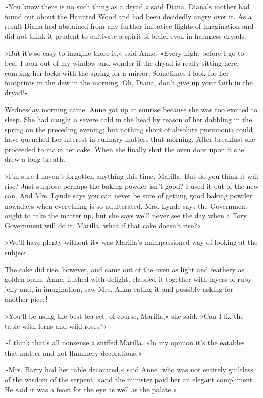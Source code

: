 »You know there is no such thing as a dryad,« said Diana. Diana's mother had found out about the Haunted Wood and had been decidedly angry over it. As a result Diana had abstained from any further imitative flights of imagination and did not think it prudent to cultivate a spirit of belief even in harmless dryads.

»But it's so easy to imagine there is,« said Anne. »Every night before I go to bed, I look out of my window and wonder if the dryad is really sitting here, combing her locks with the spring for a mirror. Sometimes I look for her footprints in the dew in the morning. Oh, Diana, don't give up your faith in the dryad!«

Wednesday morning came. Anne got up at sunrise because she was too excited to sleep. She had caught a severe cold in the head by reason of her dabbling in the spring on the preceding evening; but nothing short of absolute pneumonia could have quenched her interest in culinary matters that morning. After breakfast she proceeded to make her cake. When she finally shut the oven door upon it she drew a long breath.

»I'm sure I haven't forgotten anything this time, Marilla. But do you think it will rise? Just suppose perhaps the baking powder isn't good? I used it out of the new can. And Mrs. Lynde says you can never be sure of getting good baking powder nowadays when everything is so adulterated. Mrs. Lynde says the Government ought to take the matter up, but she says we'll never see the day when a Tory Government will do it. Marilla, what if that cake doesn't rise?«

»We'll have plenty without it« was Marilla's unimpassioned way of looking at the subject.

The cake did rise, however, and came out of the oven as light and feathery as golden foam. Anne, flushed with delight, clapped it together with layers of ruby jelly and, in imagination, saw Mrs. Allan eating it and possibly asking for another piece!

»You'll be using the best tea set, of course, Marilla,« she said. »Can I fix the table with ferns and wild roses?«

»I think that's all nonsense,« sniffed Marilla. »In my opinion it's the eatables that matter and not flummery decorations.«

»Mrs. Barry had her table decorated,« said Anne, who was not entirely guiltless of the wisdom of the serpent, »and the minister paid her an elegant compliment. He said it was a feast for the eye as well as the palate.«

